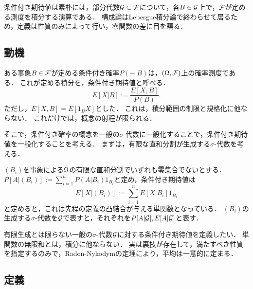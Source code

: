 \documentclass[uplatex,dvipdfmx]{jsreport}
\begin{document}
\begin{tcolorbox}[colframe=ForestGreen, colback=ForestGreen!10!white,breakable,colbacktitle=ForestGreen!40!white,coltitle=black,fonttitle=\bfseries\sffamily,
    title=]
    条件付き期待値は素朴には，部分代数$\mathcal{G}\subset\mathcal{F}$について，各$B\in\mathcal{G}$上で，$\mathcal{F}$が定める測度を積分する演算である．
    構成論はLebesgue積分論で終わらせて居るため，定義は性質のみによって行い，零関数の差に目を瞑る．
\end{tcolorbox}

\subsection{動機}

\begin{discussion}[事象の条件付き確率が定める条件付き期待値]
    ある事象$B\in\mathcal{F}$が定める条件付き確率$P(-|B)$は，$(\Omega,\mathcal{F})$上の確率測度である．
    これが定める積分を，条件付き期待値と呼べる．
    \[E[X|B]:=\frac{E[X,B]}{P(B)}.\]
    ただし，$E[X,B]=E[1_BX]$とした．
    これは，積分範囲の制限と規格化に他ならない．
    これだけでは，概念の射程が限られる．
\end{discussion}

\begin{discussion}[条件付き確率の一般化]
    そこで，条件付き確率の概念を一般の$\sigma$-代数に一般化することで，条件付き期待値を一般化することを考える．
    まずは，有限な直和分割が生成する$\sigma$-代数を考える．

    $(B_i)$を事象による$\Omega$の有限な直和分割でいずれも零集合でないとする．
    $P[A|(B_i)]:=\sum^n_{i=1}P(A|B_i)1_{B_i}$と定め，条件付き期待値は
    \[E[X|(B_i)]:=\sum_{i=1}^nE[X|B_i]1_{B_i}\]
    と定めると，これは先程の定義の凸結合が与える単関数となっている．
    $(B_i)$の生成する$\sigma$-代数を$\mathcal{G}$で表すと，それぞれを$P[A|\mathcal{G}],E[A|\mathcal{G}]$と表す．
\end{discussion}

\begin{discussion}[測度論的議論]
    有限生成とは限らない一般の$\sigma$-代数$\mathcal{G}$に対する条件付き期待値を定義したい．
    単関数の無限和とは，積分に他ならない．
    実は裏技が存在して，満たすべき性質を指定するのみで，Radon-Nykodymの定理により，平均は一意的に定まる．
\end{discussion}

\subsection{定義}
\end{document}
